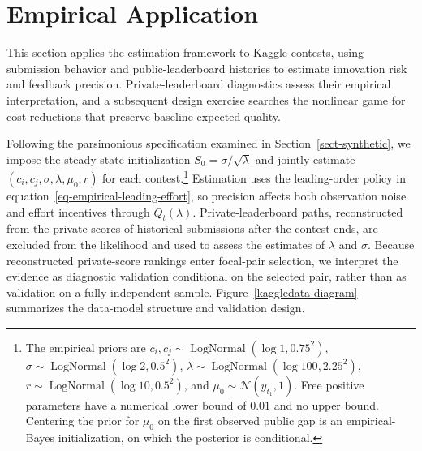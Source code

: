 \documentclass[mnsc]{informs3}
\begin{document}
\section{Empirical Application}
\label{sec-kaggle-application}

This section applies the estimation framework to Kaggle contests, using submission behavior and public-leaderboard histories to estimate innovation risk and feedback precision. Private-leaderboard diagnostics assess their empirical interpretation, and a subsequent design exercise searches the nonlinear game for cost reductions that preserve baseline expected quality.

{Following the parsimonious specification examined in Section~\ref{sect-synthetic}, we impose the steady-state initialization $S_0=\sigma/\sqrt\lambda$ and jointly estimate $(c_i,c_j,\sigma,\lambda,\mu_0,r)$ for each contest.\footnote{The empirical priors are $c_i,c_j\sim\operatorname{LogNormal}(\log1,0.75^2)$, $\sigma\sim\operatorname{LogNormal}(\log2,0.5^2)$, $\lambda\sim\operatorname{LogNormal}(\log100,2.25^2)$, $r\sim\operatorname{LogNormal}(\log10,0.5^2)$, and $\mu_0\sim\mathcal N(\hat y_{t_1},1)$. Free positive parameters have a numerical lower bound of $0.01$ and no upper bound. Centering the prior for $\mu_0$ on the first observed public gap is an empirical-Bayes initialization, on which the posterior is conditional.} Estimation uses the leading-order policy in equation~\eqref{eq-empirical-leading-effort}, so precision affects both observation noise and effort incentives through $Q_t(\lambda)$.}
{Private-leaderboard paths, reconstructed from the private scores of historical submissions after the contest ends, are excluded from the likelihood and used to assess the estimates of $\lambda$ and $\sigma$. Because reconstructed private-score rankings enter focal-pair selection, we interpret the evidence as diagnostic validation conditional on the selected pair, rather than as validation on a fully independent sample.}
Figure~\ref{kaggledata-diagram} summarizes the data-model structure and validation design.
\end{document}
